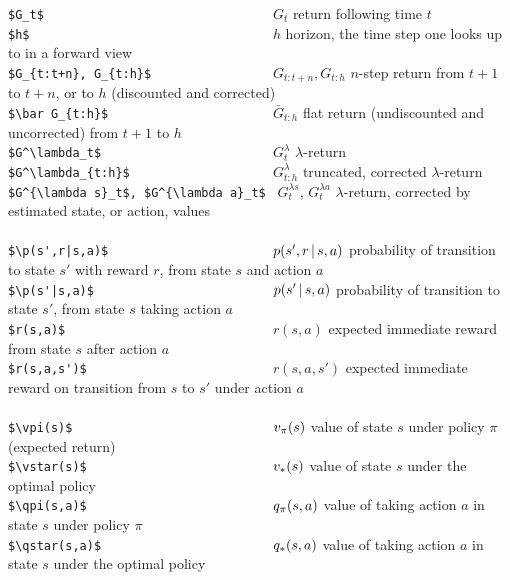 \documentclass[10pt,fleqn]{article}
\begin{document}
\begin{tabbing}
\>\verb+$G_t$                                +\>$G_t$               \> return following time $t$\\
\>\verb+$h$                                  +\>$h$                 \> horizon, the time step one looks up to in a forward view\\
\>\verb#$G_{t:t+n}, G_{t:h}$                 #\>$G_{t:t+n}, G_{t:h}$\> $n$-step return from $t+1$ to $t+n$, or to $h$ (discounted and corrected) \\
\>\verb+$\bar G_{t:h}$                       +\>$\bar G_{t:h}$      \> flat return (undiscounted and uncorrected) from $t+1$ to $h$\\
\>\verb+$G^\lambda_t$                        +\>$G^\lambda_t$       \> $\lambda$-return\\
\>\verb#$G^\lambda_{t:h}$                    #\>$G^\lambda_{t:h}$  \> truncated, corrected $\lambda$-return\\
\>\verb#$G^{\lambda s}_t$, $G^{\lambda a}_t$ # \>$G^{\lambda s}_t$, $G^{\lambda a}_t$    \> $\lambda$-return, corrected by estimated state, or action, values \\
\\
\>\verb+$\p(s',r|s,a)$                       +\>$\p(s',r|s,a)$      \> probability of transition to state $s'$ with reward $r$, from state $s$ and action $a$\\
\>\verb+$\p(s'|s,a)$                         +\>$\p(s'|s,a)$        \> probability of transition to state $s'$, from state $s$ taking action $a$\\
\>\verb+$r(s,a)$                             +\>$r(s,a)$            \> expected immediate reward from state $s$ after action $a$\\
\>\verb+$r(s,a,s')$                          +\>$r(s,a,s')$         \> expected immediate reward on transition from $s$ to $s'$ under action $a$\\
\\
\>\verb+$\vpi(s)$                            +\>$v_\pi(s)$           \> value of state $s$ under policy $\pi$ (expected return)\\
\>\verb+$\vstar(s)$                          +\>$v_*(s)$         \> value of state $s$ under the optimal policy \\
\>\verb+$\qpi(s,a)$                          +\>$q_\pi(s,a)$         \> value of taking action $a$ in state $s$ under policy $\pi$\\
\>\verb+$\qstar(s,a)$                        +\>$q_*(s,a)$       \> value of taking action $a$ in state $s$ under the optimal policy \\

\end{tabbing}
\end{document}
